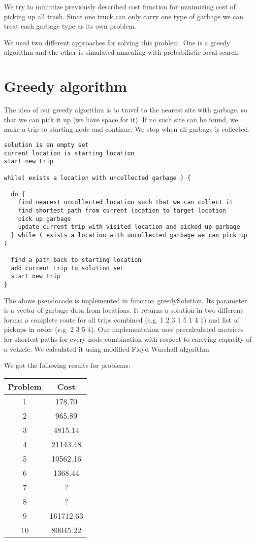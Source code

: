 \documentclass[a4paper, 12pt]{article}
\begin{document}
We try to minimize previously described cost function for minimizing cost of
picking up all trash. Since one truck can only carry one type of garbage we
can treat each garbage type as its own problem.

We used two different approaches for solving this problem. One is a greedy
algorithm and the other is simulated annealing with probabilistic local search.

\section{Greedy algorithm}

The idea of our greedy algorithm is to travel to the nearest site with garbage,
so that we can pick it up (we have space for it). If no such site can be found,
we make a trip to starting node and continue. We stop when all garbage is
collected.

\begin{lstlisting}[basicstyle=\small]
solution is an empty set
current location is starting location
start new trip

while( exists a location with uncollected garbage ) {

  do {
    find nearest uncollected location such that we can collect it
    find shortest path from current location to target location
    pick up garbage
    update current trip with visited location and picked up garbage
  } while ( exists a location with uncollected garbage we can pick up )

  find a path back to starting location
  add current trip to solution set
  start new trip
}
\end{lstlisting}

The above pseudocode is implemented in funciton {\sf greedySolution}. Its
parameter is a vector of garbage data from locations. It returns a solution in
two different forms: a complete route for all trips combined (e.g. 1 2 3 1 5 1
4 1) and list of pickups in order (e.g. 2 3 5 4). Our implementation uses
precalculated matrices for shortest paths for every node combination with
respect to carrying capacity of a vehicle. We calculated it using modified
Floyd Warshall algorithm.

We got the following results for problems:
\begin{center}
\begin{tabular}{ c|c }
	Problem & Cost \\
	\hline
	1 & 178.70 \\
	2 & 965.89 \\
	3 & 4815.14 \\
	4 & 21143.48 \\
	5 & 10562.16 \\
	6 & 1368.44 \\
	7 & ? \\
	8 & ? \\
	9 & 161712.63 \\
	10 & 80045.22 \\
\end{tabular}
\end{center}
\end{document}
